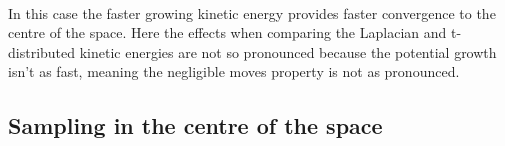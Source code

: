 \documentclass[11pt]{article}
\begin{document}
    \begin{center}
    \end{center}
    { \hspace*{\fill} \\}
    
    In this case the faster growing kinetic energy provides faster
convergence to the centre of the space. Here the effects when comparing
the Laplacian and t-distributed kinetic energies are not so pronounced
because the potential growth isn't as fast, meaning the negligible moves
property is not as pronounced.

    \subsection{Sampling in the centre of the
space}\label{sampling-in-the-centre-of-the-space}
\end{document}

